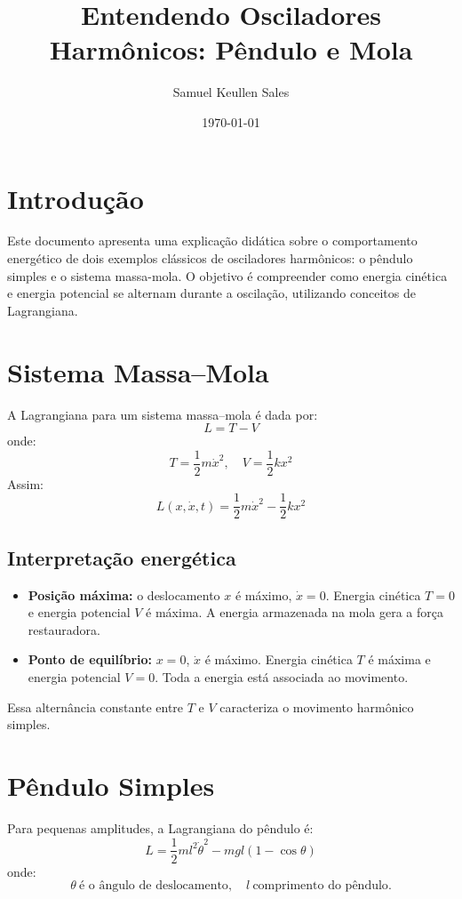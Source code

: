 \documentclass[12pt,a4paper]{article}
\title{Entendendo Osciladores Harmônicos: Pêndulo e Mola}
\author{Samuel Keullen Sales}
\date{\today}
\begin{document}
\maketitle

\section*{Introdução}

Este documento apresenta uma explicação didática sobre o comportamento energético de dois exemplos clássicos de osciladores harmônicos:  
o pêndulo simples e o sistema massa-mola. O objetivo é compreender como energia cinética e energia potencial se alternam durante a oscilação, utilizando conceitos de Lagrangiana.

\section{Sistema Massa–Mola}

A Lagrangiana para um sistema massa–mola é dada por:
\[
L = T - V
\]
onde:
\[
T = \frac{1}{2} m \dot{x}^2, \quad V = \frac{1}{2} k x^2
\]
Assim:
\[
L(x, \dot{x}, t) = \frac{1}{2} m \dot{x}^2 - \frac{1}{2} k x^2
\]

\subsection*{Interpretação energética}

\begin{itemize}
    \item \textbf{Posição máxima:} o deslocamento \(x\) é máximo, \(\dot{x} = 0\).  
    Energia cinética \(T = 0\) e energia potencial \(V\) é máxima. A energia armazenada na mola gera a força restauradora.
    
    \item \textbf{Ponto de equilíbrio:} \(x = 0\), \(\dot{x}\) é máximo.  
    Energia cinética \(T\) é máxima e energia potencial \(V = 0\). Toda a energia está associada ao movimento.
\end{itemize}

Essa alternância constante entre \(T\) e \(V\) caracteriza o movimento harmônico simples.

\section{Pêndulo Simples}

Para pequenas amplitudes, a Lagrangiana do pêndulo é:
\[
L = \frac{1}{2} m l^2 \dot{\theta}^2 - m g l (1 - \cos\theta)
\]
onde:
\[
\theta \ \text{é o ângulo de deslocamento}, \quad l \ \text{comprimento do pêndulo}.
\]
\end{document}
